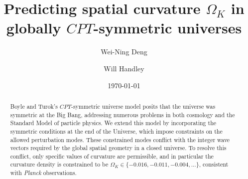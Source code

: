 \documentclass[%
 reprint,
 amsmath,amssymb,
 prl,
]{revtex4-2}
\begin{document}

\title{Predicting spatial curvature $\Omega_K$ in globally $CPT$-symmetric universes}%

\author{Wei-Ning Deng}
 

\author{Will Handley}%


\date{\today}%

\begin{abstract}
    Boyle and Turok's $CPT$-symmetric universe model posits that the universe was symmetric at the Big Bang, addressing numerous problems in both cosmology and the Standard Model of particle physics. We extend this model by incorporating the symmetric conditions at the end of the Universe, which impose constraints on the allowed perturbation modes. These constrained modes conflict with the integer wave vectors required by the global spatial geometry in a closed universe. To resolve this conflict, only specific values of curvature are permissible, and in particular the curvature density is constrained to be $\Omega_K \in \{-0.016, -0.011, -0.004, \ldots\}$, consistent with \textit{Planck} observations.
\end{abstract}

\maketitle
\end{document}
